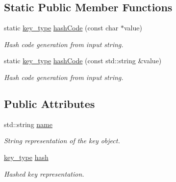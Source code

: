 \subsection*{Static Public Member Functions}
\begin{DoxyCompactItemize}
\item 
static \hyperlink{class_d_d4hep_1_1_conditions_1_1_condition_key_a08bfc8ccb807bdd5e4d9f3b065d1c8f5}{key\_\-type} \hyperlink{class_d_d4hep_1_1_conditions_1_1_condition_key_a1aaef3356d9fd2475b02e3c01c64e46a}{hashCode} (const char $\ast$value)
\begin{DoxyCompactList}\small\item\em Hash code generation from input string. \item\end{DoxyCompactList}\item 
static \hyperlink{class_d_d4hep_1_1_conditions_1_1_condition_key_a08bfc8ccb807bdd5e4d9f3b065d1c8f5}{key\_\-type} \hyperlink{class_d_d4hep_1_1_conditions_1_1_condition_key_a1420df2db54a634af5aa8a033e080c54}{hashCode} (const std::string \&value)
\begin{DoxyCompactList}\small\item\em Hash code generation from input string. \item\end{DoxyCompactList}\end{DoxyCompactItemize}
\subsection*{Public Attributes}
\begin{DoxyCompactItemize}
\item 
std::string \hyperlink{class_d_d4hep_1_1_conditions_1_1_condition_key_a37729a238b66d69101805d98199544c1}{name}
\begin{DoxyCompactList}\small\item\em String representation of the key object. \item\end{DoxyCompactList}\item 
\hyperlink{class_d_d4hep_1_1_conditions_1_1_condition_key_a08bfc8ccb807bdd5e4d9f3b065d1c8f5}{key\_\-type} \hyperlink{class_d_d4hep_1_1_conditions_1_1_condition_key_a6eb2b4ac135f9ca4e35737a4d64c16b3}{hash}
\begin{DoxyCompactList}\small\item\em Hashed key representation. \item\end{DoxyCompactList}\end{DoxyCompactItemize}


